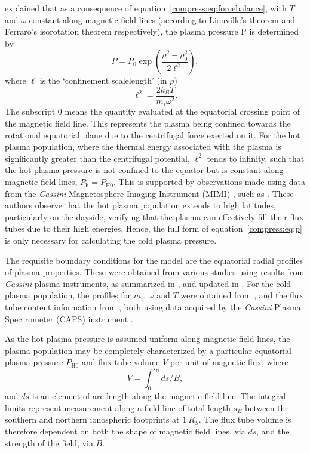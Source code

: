 \citet{caudal1986} explained that as a consequence of equation~\ref{compress:eq:forcebalance}, with $T$ and $\omega$ constant along magnetic field lines (according to Liouville's theorem and Ferraro's isorotation theorem respectively), the plasma pressure P is determined by 
\begin{equation}\label{compress:eq:p}
P = P_{0}\exp\left(\frac{\rho^2-\rho_0^2}{2\ell^2}\right),
\end{equation}
where $\ell$ is the `confinement scalelength' (in $\rho$)
\begin{equation}
\ell^2 = \frac{2k_BT}{m_i\omega^2}.
\end{equation}
The subscript 0 means the quantity evaluated at the equatorial crossing point of the magnetic field line. This represents the plasma being confined towards the rotational equatorial plane due to the centrifugal force exerted on it. For the hot plasma population, where the thermal energy associated with the plasma is significantly greater than the centrifugal potential, $\ell^2$ tends to infinity, such that the hot plasma pressure is not confined to the equator but is constant along magnetic field lines, $P_\mathrm{h} = P_\mathrm{H0}$. This is supported by observations made using data from the \textit{Cassini} Magnetosphere Imaging Instrument (MIMI) \citep{krimigis2004}, such as \citet{krimigis2007}. These authors observe that the hot plasma population extends to high latitudes, particularly on the dayside, verifying that the plasma can effectively fill their flux tubes due to their high energies. Hence, the full form of equation~\ref{compress:eq:p} is only necessary for calculating the cold plasma pressure.

The requisite boundary conditions for the model are the equatorial radial profiles of plasma properties. These were obtained from various studies using results from \textit{Cassini} plasma instruments, as summarized in \citet{achilleos2010a}, and updated in \citet{achilleos2010b}. For the cold plasma population, the profiles for $m_i$, $\omega$ and $T$ were obtained from \citet{wilson2008}, and the flux tube content information from \citet{mcandrews2009}, both using data acquired by the \textit{Cassini} Plasma Spectrometer (CAPS) instrument \citep{young2004}.

As the hot plasma pressure is assumed uniform along magnetic field lines, the plasma population may be completely characterized by a particular equatorial plasma pressure $P_\mathrm{H0}$ and flux tube volume $V$ per unit of magnetic flux, where
\begin{equation}\label{compress:eq:ftv}
V = \int_{0}^{s_{B}} ds/B,
\end{equation}
and $ds$ is an element of arc length along the magnetic field line. The integral limits represent measurement along a field line of total length $s_B$ between the southern and northern ionospheric footprints at $\SI{1}{R_S}$. The flux tube volume is therefore dependent on both the shape of magnetic field lines, via $ds$, and the strength of the field, via $B$.

